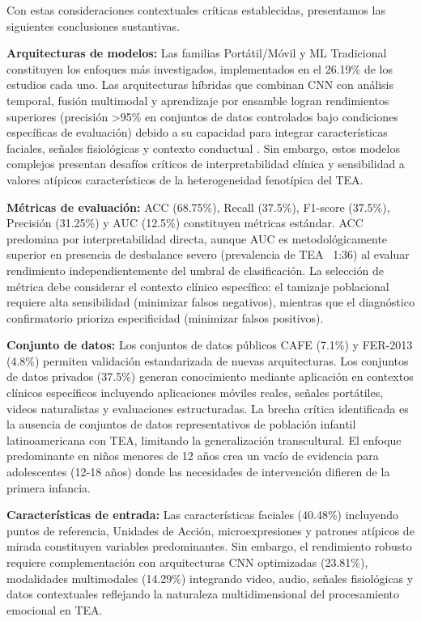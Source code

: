 \documentclass{ieeeaccess}
\begin{document}
	Con estas consideraciones contextuales críticas establecidas, presentamos las siguientes conclusiones sustantivas.
	
	\textbf{Arquitecturas de modelos:} Las familias Portátil/Móvil y ML Tradicional constituyen los enfoques más investigados, implementados en el 26.19\% de los estudios cada uno. Las arquitecturas híbridas que combinan CNN con análisis temporal, fusión multimodal y aprendizaje por ensamble logran rendimientos superiores (precisión >95\% en conjuntos de datos controlados bajo condiciones específicas de evaluación) debido a su capacidad para integrar características faciales, señales fisiológicas y contexto conductual \cite{b21,b22}. Sin embargo, estos modelos complejos presentan desafíos críticos de interpretabilidad clínica y sensibilidad a valores atípicos característicos de la heterogeneidad fenotípica del TEA.
	
	\textbf{Métricas de evaluación:} ACC (68.75\%), Recall (37.5\%), F1-score (37.5\%), Precisión (31.25\%) y AUC (12.5\%) constituyen métricas estándar. ACC predomina por interpretabilidad directa, aunque AUC es metodológicamente superior en presencia de desbalance severo (prevalencia de TEA ~1:36) al evaluar rendimiento independientemente del umbral de clasificación. La selección de métrica debe considerar el contexto clínico específico: el tamizaje poblacional requiere alta sensibilidad (minimizar falsos negativos), mientras que el diagnóstico confirmatorio prioriza especificidad (minimizar falsos positivos).
	
	\textbf{Conjunto de datos:} Los conjuntos de datos públicos CAFE (7.1\%) y FER-2013 (4.8\%) permiten validación estandarizada de nuevas arquitecturas. Los conjuntos de datos privados (37.5\%) generan conocimiento mediante aplicación en contextos clínicos específicos incluyendo aplicaciones móviles reales, señales portátiles, videos naturalistas y evaluaciones estructuradas. La brecha crítica identificada es la ausencia de conjuntos de datos representativos de población infantil latinoamericana con TEA, limitando la generalización transcultural. El enfoque predominante en niños menores de 12 años crea un vacío de evidencia para adolescentes (12-18 años) donde las necesidades de intervención difieren de la primera infancia.
	
	\textbf{Características de entrada:} Las características faciales (40.48\%) incluyendo puntos de referencia, Unidades de Acción, microexpresiones y patrones atípicos de mirada constituyen variables predominantes. Sin embargo, el rendimiento robusto requiere complementación con arquitecturas CNN optimizadas (23.81\%), modalidades multimodales (14.29\%) integrando video, audio, señales fisiológicas y datos contextuales reflejando la naturaleza multidimensional del procesamiento emocional en TEA.
	
\end{document}
